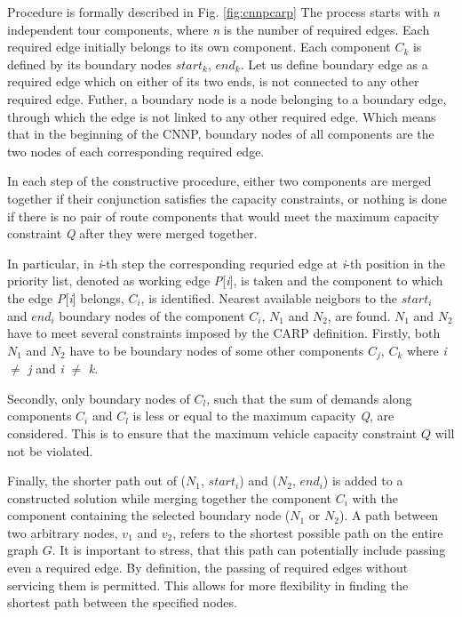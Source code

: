 \documentclass[twoside]{ctuthesis}
\theoremstyle{plain}
\theoremstyle{definition}
\theoremstyle{note}
\begin{document}
Procedure is formally described in Fig. \ref{fig:cnnpcarp}
The process starts with \emph{n} independent tour components, where \emph{n} is the number of required edges. Each required edge initially belongs to its own component. Each component \emph{$C_k$} is defined by its boundary nodes {\emph{$start_k$}, \emph{$end_k$}}. Let us define boundary edge as a required edge which on either of its two ends, is not connected to any other required edge. Futher, a boundary node is a node belonging to a boundary edge, through which the edge is not linked to any other required edge. Which means that in the beginning of the CNNP, boundary nodes of all components are the two nodes of each corresponding required edge.

In each step of the constructive procedure, either two components are merged together if their conjunction satisfies the capacity constraints, or nothing is done if there is no pair of route components that would meet the maximum capacity constraint \emph{Q} after they were merged together.

In particular, in \emph{i}-th step the corresponding requried edge at \emph{i}-th position in the priority list, denoted as working edge \emph{P}[\emph{i}], is taken and the component to which the edge \emph{P}[\emph{i}] belongs, \emph{$C_i$}, is identified. Nearest available neigbors to the \emph{$start_i$} and \emph{$end_i$} boundary nodes of the component \emph{$C_i$}, \emph{$N_1$} and \emph{$N_2$}, are found. \emph{$N_1$} and \emph{$N_2$} have to meet several constraints imposed by the CARP definition. Firstly, both \emph{$N_1$} and \emph{$N_2$} have to be boundary nodes of some other components \emph{$C_j$}, \emph{$C_k$} where \emph{i} $\neq$ \emph{j} and \emph{i} $\neq$ \emph{k}. 

Secondly, only boundary nodes of \emph{$C_l$}, such that the sum of demands along components \emph{$C_i$} and \emph{$C_l$} is less or equal to the maximum capacity \emph{Q}, are considered. This is to ensure that the maximum vehicle capacity constraint $Q$ will not be violated.

Finally, the shorter path out of (\emph{$N_1$}, \emph{$start_i$}) and (\emph{$N_2$}, \emph{$end_i$}) is added to a constructed solution while merging together the component \emph{$C_i$} with the component containing the selected boundary node (\emph{$N_1$} or \emph{$N_2$}).
A path between two arbitrary nodes, $v_1$ and $v_2$, refers to the shortest possible path on the entire graph $G$. It is important to stress, that this path can potentially include passing even a required edge. By definition, the passing of required edges without servicing them is permitted. This allows for more flexibility in finding the shortest path between the specified nodes.
\end{document}
